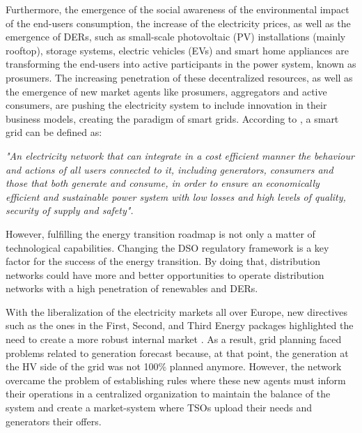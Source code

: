 Furthermore, the emergence of the social awareness of the environmental impact of the end-users consumption, the increase of the electricity prices, as well as the emergence of DERs, such as small-scale photovoltaic (PV) installations (mainly rooftop), storage systems, electric vehicles (EVs) and smart home appliances are transforming the end-users into active participants in the power system, known as prosumers. The increasing penetration of these decentralized resources, as well as the emergence of new market agents like prosumers, aggregators and active consumers, are pushing the electricity system to include innovation in their business models, creating the paradigm of smart grids. According to \cite{EuropeanParliamentSG}, a smart grid can be defined as:
\vspace*{3mm}
\begin{tcolorbox}
\textit{"An electricity network that can integrate in a cost efficient manner the behaviour and actions of all users connected to it, including generators, consumers and those that both generate and consume, in order to ensure an economically efficient and sustainable power system with low losses and high levels of quality, security of supply and safety".} 
\end{tcolorbox}
\vspace*{5mm}


However, fulfilling the energy transition roadmap is not only a matter of technological capabilities. Changing the DSO regulatory framework is a key factor for the success of the energy transition. By doing that, distribution networks could have more and better opportunities to operate distribution networks with a high penetration of renewables and DERs. 

With the liberalization of the electricity markets all over Europe, new directives such as the ones in the First, Second, and Third Energy packages \cite{EuropeanCommission2003, EuropeanCommission2009} highlighted the need to create a more robust internal market \cite{Hancher2017, EUPHEMIA2016, antonopoulos2020nodal}. As a result, grid planning faced problems related to generation forecast because, at that point, the generation at the HV side of the grid was not 100$\%$ planned anymore. However, the network overcame the problem of establishing rules where these new agents must inform their operations in a centralized organization to maintain the balance of the system and create a market-system where TSOs upload their needs and generators their offers. 

